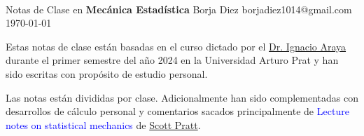 \documentclass[11pt]{article}
\author{Borja Diez}
\affiliation{Universidad Arturo Prat}
\theoremstyle{definition}
\begin{document}
\thispagestyle{empty}
\bigskip \
\vspace{0.1cm}

\begin{center}
{\fontsize{22}{22} \selectfont Notas de Clase en}
\vskip 16pt
{\fontsize{36}{36} \selectfont \bf \sffamily Mecánica Estadística}
\vskip 24pt
{\fontsize{18}{18} \selectfont \rmfamily Borja Diez} 
\vskip 6pt
{\fontsize{14}{14} \selectfont \ttfamily borjadiez1014@gmail.com}
\vskip 6pt
{\fontsize{14}{14} \selectfont  \sffamily \today}
\vskip 24pt
\end{center}


Estas notas de clase están basadas en el curso dictado por el \href{https://inspirehep.net/authors/1318424?ui-citation-summary=true}{Dr. Ignacio Araya} durante el primer semestre del año 2024 en la Universidad Arturo Prat y han sido escritas con propósito de estudio personal.

Las notas están divididas por clase. Adicionalmente han sido complementadas con desarrollos de cálculo personal y comentarios sacados principalmente de \textcolor{blue}{Lecture notes on statistical mechanics} de \href{https://inspirehep.net/authors/992816}{Scott Pratt}. 

\newpage
\tableofcontents
\newpage


\newpage

\newpage

\newpage

\newpage

\newpage

\newpage

\newpage

\newpage

\newpage








\newpage


\end{document}
